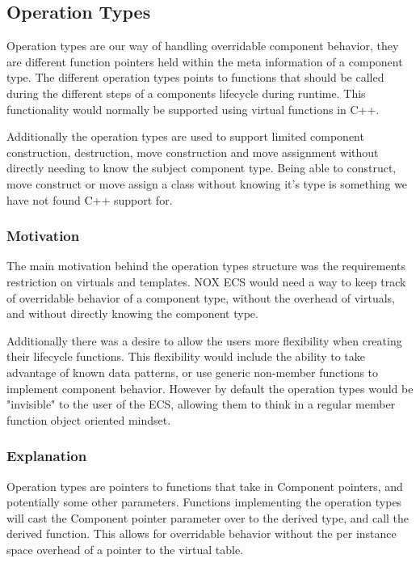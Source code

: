 \subsection{Operation Types}
\label{subsec:detailed_operation_types}
Operation types are our way of handling overridable component behavior,
they are different function pointers held within the meta information of a component type.
The different operation types points to functions that should be called during the different steps
of a components lifecycle during runtime.
This functionality would normally be supported using virtual functions in C++.

Additionally the operation types are used to support limited component construction, destruction,
move construction and move assignment without directly needing to know the subject component type.
Being able to construct, move construct or move assign a class without knowing it's type
is something we have not found C++ support for.

\subsubsection{Motivation}
The main motivation behind the operation types structure was the requirements restriction on virtuals
and templates.
NOX ECS would need a way to keep track of overridable behavior of a component type, without the overhead of virtuals,
and without directly knowing the component type.

Additionally there was a desire to allow the users more flexibility when creating their lifecycle functions.
This flexibility would include the ability to take advantage of known data patterns,
or use generic non-member functions to implement component behavior.
However by default the operation types would be "invisible" to the user of the ECS,
allowing them to think in a regular member function object oriented mindset.

\subsubsection{Explanation}
Operation types are pointers to functions that take in Component pointers,
and potentially some other parameters.
Functions implementing the operation types will cast the Component pointer parameter over to the derived type,
and call the derived function.
This allows for overridable behavior without the per instance space overhead of a pointer to the virtual table.

